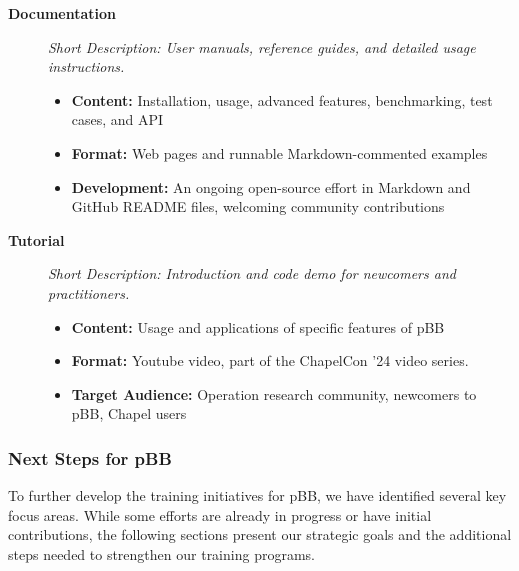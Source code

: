 \begin{description}

\item[\textbf{Documentation}]
\emph{Short Description: User manuals, reference guides, and detailed usage instructions.}

\begin{itemize}
\item \textbf{Content:} Installation, usage, advanced features, benchmarking, test cases, and API
\item \textbf{Format:} Web pages and runnable Markdown-commented examples
\item \textbf{Development:} An ongoing open-source effort in Markdown and GitHub README files, welcoming community contributions
\end{itemize}

\item[\textbf{Tutorial}]
\emph{Short Description: Introduction and code demo for newcomers and practitioners.}

\begin{itemize}
\item \textbf{Content:} Usage and applications of specific features of pBB
\item \textbf{Format:} Youtube video, part of the ChapelCon '24 video series.
\item \textbf{Target Audience:} Operation research community, newcomers to pBB, Chapel users
\end{itemize}

\end{description}

\subsubsection{Next Steps for pBB}
\label{sec:pBB:next-steps}

To further develop the training initiatives for pBB, we have identified several key focus areas.
While some efforts are already in progress or have initial contributions, the following sections present our strategic goals and the additional steps needed to strengthen our training programs.

